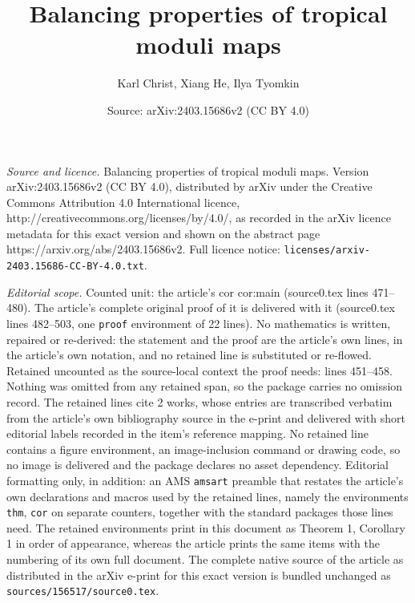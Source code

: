 \documentclass[10pt,a4paper]{amsart}
\title{Balancing properties of tropical moduli maps}
\author{Karl Christ, Xiang He, Ilya Tyomkin}
\date{Source: arXiv:2403.15686v2 (CC BY 4.0)}
\begin{document}
\maketitle

\noindent\emph{Source and licence.} Balancing properties of tropical moduli maps. Version arXiv:2403.15686v2 (CC BY 4.0), distributed by arXiv under the Creative Commons Attribution 4.0 International licence, http://creativecommons.org/licenses/by/4.0/, as recorded in the arXiv licence metadata for this exact version and shown on the abstract page https://arxiv.org/abs/2403.15686v2. Full licence notice: \texttt{licenses/arxiv-2403.15686-CC-BY-4.0.txt}.\par\smallskip

\noindent\textit{Editorial scope.} Counted unit: the article's cor cor:main (source0.tex lines 471--480). The article's complete original proof of it is delivered with it (source0.tex lines 482--503, one \texttt{proof} environment of 22 lines). No mathematics is written, repaired or re-derived: the statement and the proof are the article's own lines, in the article's own notation, and no retained line is substituted or re-flowed.  Retained uncounted as the source-local context the proof needs: lines 451--458.  Nothing was omitted from any retained span, so the package carries no omission record.  The retained lines cite 2 works, whose entries are transcribed verbatim from the article's own bibliography source in the e-print and delivered with short editorial labels recorded in the item's reference mapping.  No retained line contains a figure environment, an image-inclusion command or drawing code, so no image is delivered and the package declares no asset dependency.  Editorial formatting only, in addition: an AMS \texttt{amsart} preamble that restates the article's own declarations and macros used by the retained lines, namely the environments \texttt{thm}, \texttt{cor} on separate counters, together with the standard packages those lines need.  The retained environments print in this document as Theorem 1, Corollary 1 in order of appearance, whereas the article prints the same items with the numbering of its own full document.  The complete native source of the article as distributed in the arXiv e-print for this exact version is bundled unchanged as \texttt{sources/156517/source0.tex}.
\end{document}
